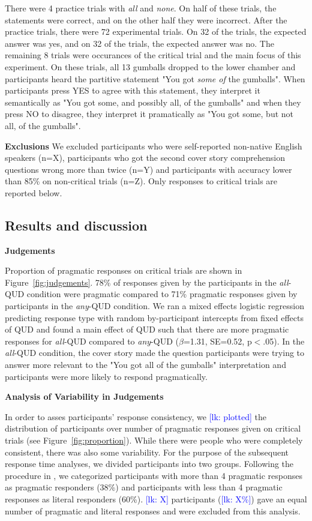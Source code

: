 \documentclass[10pt,letterpaper]{article}
\newcommand{\lk}[1]{\textcolor{Blue}{[lk: #1]}}
\begin{document}
There were 4 practice trials with \textit{all} and \textit{none}. On half of these trials, the statements were correct, and on the other half they were incorrect. After the practice trials, there were 72 experimental trials. On 32 of the trials, the expected answer was yes, and on 32 of the trials, the expected answer was no. The remaining 8 trials were occurances of the critical trial and the main focus of this experiment. On these trials, all 13 gumballs dropped to the lower chamber and participants heard the partitive statement "You got \textit{some of} the gumballs". When participants press YES to agree with this statement, they interpret it semantically as "You got some, and possibly all, of the gumballs" and when they press NO to disagree, they interpret it pramatically as "You got some, but not all, of the gumballs". 

\noindent \textbf{Exclusions} We excluded participants who were self-reported non-native English speakers (n=X), participants who got the second cover story comprehension questions wrong more than twice (n=Y) and participants with accuracy lower than 85\% on non-critical trials (n=Z). Only responses to critical trials are reported below.

\subsection{Results and discussion}

\noindent \textbf{Judgements}

Proportion of pragmatic responses on critical trials are shown in Figure~\ref{fig:judgements}. 78\% of responses given by the participants in the \textit{all}-QUD condition were pragmatic compared to 71\% pragmatic responses given by participants in the \textit{any}-QUD condition. We ran a mixed effects logistic regression predicting response type with random by-participant intercepts from fixed effects of QUD and found a main effect of QUD such that there are more pragmatic responses for \textit{all}-QUD compared to \textit{any}-QUD ($\beta$=1.31, SE=0.52, p$<$.05). In the \textit{all}-QUD condition, the cover story made the question participants were trying to answer more relevant to the "You got all of the gumballs" interpretation and participants were more likely to respond pragmatically.

\noindent \textbf{Analysis of Variability in Judgements} 

 In order to asses participants' response consistency, we \lk{plotted} the distribution of participants over number of pragmatic responses given on critical trials (see Figure~\ref{fig:proportion}).  While there were people who were completely consistent, there was also some variability. For the purpose of the subsequent response time analyses, we divided participants into two groups. Following the procedure in , we categorized participants with more than 4 pragmatic responses as pragmatic responders (38\%) and participants with less than 4 pragmatic responses as literal responders (60\%). \lk{X} participants (\lk{X\%}) gave an equal number of pragmatic and literal responses and were excluded from this analysis.
\end{document}
